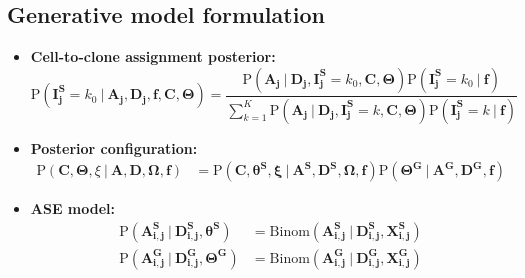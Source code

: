 \documentclass[11pt,a4paper,fullpage]{article}
\def\P{\mathrm{P}}
\theoremstyle{definition}
\theoremstyle{definition}
\theoremstyle{definition}
\numberwithin{equation}{section}
\begin{document}
	\subsection{Generative model formulation}
	\begin{itemize}
		\item \textbf{Cell-to-clone assignment posterior:}
		\begin{equation}
		\P(\mathbf{I^{S}_{j}} = k_{0} \ |\  \mathbf{A_{j}}, \mathbf{D_{j}}, \mathbf{f}, \mathbf{C}, \mathbf{\Theta}) =  
		\dfrac{\P(\mathbf{A_j} \ |\  \mathbf{D_j}, \mathbf{I^{S}_{j}} = k_{0}, \mathbf{C}, \mathbf{\Theta}) \P(\mathbf{I^{S}_{j}} = k_{0} \ |\  \textbf{f}) }{\sum\limits_{k=1}^{K}\P(\mathbf{A_j} \ |\  \mathbf{D_j}, \mathbf{I^{S}_{j}} = k, \mathbf{C}, \mathbf{\Theta}) \P(\mathbf{I^{S}_{j}} = k\ |\  \textbf{f}) }
		\end{equation}
		
		\item \textbf{Posterior configuration: }
		\begin{equation}
		\begin{aligned}
		\P(\mathbf{C}, \mathbf{\Theta}, \xi\ |\  \mathbf{A}, \mathbf{D}, \mathbf{\Omega}, \mathbf{f}) &= \P(\mathbf{C}, \mathbf{\theta^{S}}, \mathbf{\xi}\ |\ \mathbf{A^{S}}, \mathbf{D^{S}}, \mathbf{\Omega}, \mathbf{f}) \P(\mathbf{\Theta^{G}}\ |\ \mathbf{A^{G}}, \mathbf{D^{G}}, \mathbf{f})
		\end{aligned}
		\end{equation}
		
		\item \textbf{ASE model:}
		\begin{equation}
		\begin{aligned}
		\P(\mathbf{A^S_{i,j}}\ |\ \mathbf{D^S_{i,j}}, \mathbf{\theta^{S}}) &= \mathrm{Binom}(\mathbf{A^S_{i,j}}\ |\ \mathbf{D^S_{i,j}}, \mathbf{X^{S}_{i,j}})\\
		\P(\mathbf{A^{G}_{i,j}}\ |\ \mathbf{D^{G}_{i,j}}, \mathbf{\Theta^{G}}) &= \mathrm{Binom}(\mathbf{A^{G}_{i,j}}\ |\ \mathbf{D^{G}_{i,j}}, \mathbf{X^{G}_{i,j}}) 
		\end{aligned}
		\end{equation}
		

\end{itemize}
\end{document}
